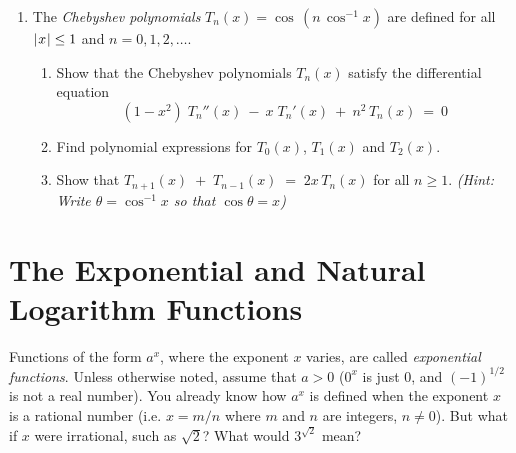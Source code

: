 {\begin{enumerate}[\bfseries 1.]
 \item The \emph{Chebyshev polynomials}
 $T_n(x) = \cos\,(n\,\cos^{-1} x)$ are defined for all $\lvert\mspace{1mu}x\mspace{1mu}\rvert \le 1$ and
 $n = 0, 1, 2, \ldots$.
 \begin{enumerate}[\bfseries (a)]
  \item Show that the Chebyshev polynomials $T_{n}(x)$ satisfy the differential
  equation
\[
(1 - x^2)\;T_{n}''(x) ~-~ x\;T_{n}'(x) ~+~ n^2\,T_{n}(x) ~=~ 0
\]
  \item Find polynomial expressions for $T_0(x)$, $T_1(x)$ and $T_2(x)$.
  \item Show that $T_{n+1}(x) \;+\; T_{n-1}(x) \;=\; 2x\,T_{n}(x)$ for all
  $n \ge 1$. \emph{(Hint: Write $\theta = \cos^{-1} x$ so that
  $\cos \theta = x$)}
 \end{enumerate}
\end{enumerate}}
\newpage
\section{The Exponential and Natural Logarithm Functions}\label{sec:exponential-and-natural-logarithm-functions}
Functions of the form $a^x$, where the exponent $x$ varies, are called
\emph{exponential functions}.
Unless otherwise noted, assume that $a > 0$ ($0^x$ is just 0, and $(-1)^{1/2}$
is not a real number). You already know how $a^x$ is defined when the exponent
$x$ is a rational number (i.e. $x = m/n$ where $m$ and $n$ are integers,
$n \ne 0$). But what if $x$ were irrational, such as $\sqrt{2}$? What would
$3^{\sqrt{2}}$ mean?

